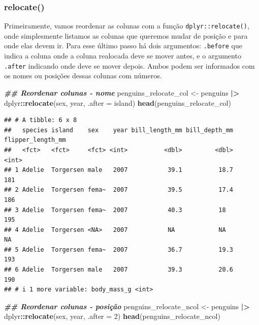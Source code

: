 \documentclass[
]{article}
\newenvironment{Shaded}{\begin{snugshade}}{\end{snugshade}}
\newcommand{\AttributeTok}[1]{\textcolor[rgb]{0.13,0.29,0.53}{#1}}
\newcommand{\DecValTok}[1]{\textcolor[rgb]{0.00,0.00,0.81}{#1}}
\newcommand{\DocumentationTok}[1]{\textcolor[rgb]{0.56,0.35,0.01}{\textbf{\textit{#1}}}}
\newcommand{\FunctionTok}[1]{\textcolor[rgb]{0.13,0.29,0.53}{\textbf{#1}}}
\newcommand{\NormalTok}[1]{#1}
\newcommand{\OtherTok}[1]{\textcolor[rgb]{0.56,0.35,0.01}{#1}}
\newcommand{\SpecialCharTok}[1]{\textcolor[rgb]{0.81,0.36,0.00}{\textbf{#1}}}
\begin{document}
\hypertarget{relocate}{%
\subsubsection{relocate()}\label{relocate}}

Primeiramente, vamos reordenar as colunas com a função \texttt{dplyr::relocate()}, onde simplesmente listamos as colunas que queremos mudar de posição e para onde elas devem ir. Para esse último passo há dois argumentos: \texttt{.before} que indica a coluna onde a coluna realocada deve se mover antes, e o argumento \texttt{.after} indicando onde deve se mover depois. Ambos podem ser informados com os nomes ou posições dessas colunas com números.

\begin{Shaded}
\begin{Highlighting}[]
\DocumentationTok{\#\# Reordenar colunas {-} nome}
\NormalTok{penguins\_relocate\_col }\OtherTok{\textless{}{-}}\NormalTok{ penguins }\SpecialCharTok{|\textgreater{}} 
\NormalTok{    dplyr}\SpecialCharTok{::}\FunctionTok{relocate}\NormalTok{(sex, year, }\AttributeTok{.after =}\NormalTok{ island)}
\FunctionTok{head}\NormalTok{(penguins\_relocate\_col)}
\end{Highlighting}
\end{Shaded}

\begin{verbatim}
## # A tibble: 6 x 8
##   species island    sex    year bill_length_mm bill_depth_mm flipper_length_mm
##   <fct>   <fct>     <fct> <int>          <dbl>         <dbl>             <int>
## 1 Adelie  Torgersen male   2007           39.1          18.7               181
## 2 Adelie  Torgersen fema~  2007           39.5          17.4               186
## 3 Adelie  Torgersen fema~  2007           40.3          18                 195
## 4 Adelie  Torgersen <NA>   2007           NA            NA                  NA
## 5 Adelie  Torgersen fema~  2007           36.7          19.3               193
## 6 Adelie  Torgersen male   2007           39.3          20.6               190
## # i 1 more variable: body_mass_g <int>
\end{verbatim}

\begin{Shaded}
\begin{Highlighting}[]
\DocumentationTok{\#\# Reordenar colunas {-} posição}
\NormalTok{penguins\_relocate\_ncol }\OtherTok{\textless{}{-}}\NormalTok{ penguins }\SpecialCharTok{|\textgreater{}} 
\NormalTok{    dplyr}\SpecialCharTok{::}\FunctionTok{relocate}\NormalTok{(sex, year, }\AttributeTok{.after =} \DecValTok{2}\NormalTok{)}
\FunctionTok{head}\NormalTok{(penguins\_relocate\_ncol)}
\end{Highlighting}
\end{Shaded}
\end{document}
